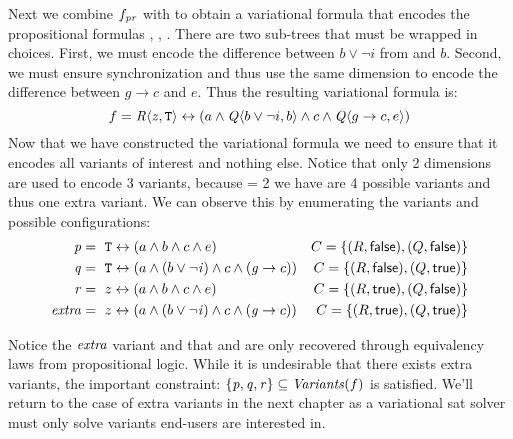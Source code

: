 Next we combine $f_{\mathit{p}\mathit{r}}$ with \qV{} to obtain a variational formula that encodes the
propositional formulas \pV{}, \qV{}, \rV{}. There are two sub-trees that must be
wrapped in choices. First, we must encode the difference between $b \vee \neg i$
from \qV{} and $b$. Second, we must ensure synchronization and thus use the same
dimension to encode the difference between $g \rightarrow c$ and $e$. Thus the
resulting variational formula is:
%
\begin{equation*}
  f = \chc[\dimR]{\zV, \tru{}} \leftrightarrow (a \wedge \chc[\dimQ]{b \vee \neg i, b} \wedge c \wedge \chc[\dimQ]{g \rightarrow c, e})
\end{equation*}
%
Now that we have constructed the variational formula we need to ensure that it
encodes all variants of interest and nothing else. Notice that only 2 dimensions
are used to encode 3 variants, because  = 2 we have are 4
possible variants and thus one extra variant. We can observe this by enumerating
the variants and possible configurations:
%
\begin{align*}
  \pV &=\ \tru{} \leftrightarrow (a \wedge b \wedge c \wedge e)                          & C = \{(\dimR, \false), (\dimQ, \false)\} \\
  \qV &=\ \tru{} \leftrightarrow (a \wedge (b \vee \neg \iV{}) \wedge c \wedge (\gV{} \rightarrow c))   & C = \{(\dimR, \false), (\dimQ, \true)\} \\
  \rV &=~z \leftrightarrow (a \wedge b \wedge c \wedge e)                               & C = \{(\dimR, \true), (\dimQ, \false)\} \\
  \kf{extra} &=~z \leftrightarrow (a \wedge (b \vee \neg \iV{}) \wedge c \wedge (\gV{} \rightarrow c)) & C = \{(\dimR, \true), (\dimQ, \true)\}
\end{align*}
%

Notice the $\mathit{extra}$ variant and that \pV{} and \qV{} are only recovered
through equivalency laws from propositional logic. While it is undesirable that
there exists extra variants, the important constraint: $\{ \mathit{p}, \mathit{q}, \mathit{r} \}
\subseteq \mathit{Variants}(f)$ is satisfied. We'll return to the case of extra variants in the next chapter as a variational \ac{sat}
solver must only solve variants end-users are interested in.



